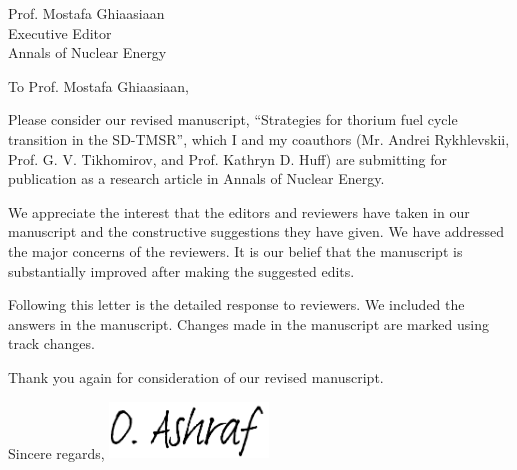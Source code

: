 \documentclass[11pt]{letter} %
\newcommand{\RecipientName}{Prof. Mostafa Ghiaasiaan\xspace}
\newcommand{\RecipientAddress}{Executive Editor\\Annals of Nuclear Energy}
\begin{document}
	\begin{letter}{\RecipientName\\
			\RecipientAddress\xspace}
		
		\address{O. Ashraf\\
			oabdelaziz@mephi.ru\\
			osama.ashraf@edu.asu.edu.eg\\
			Institute of Nuc. Physics and Eng.\\
			National Research Nuclear University\\
			Moscow, Russia, 115409}
		
		
		\opening{To \RecipientName,}
		
		Please consider our revised manuscript, ``Strategies for thorium fuel cycle transition in the SD-TMSR'', which I and my coauthors (Mr. Andrei Rykhlevskii, Prof. G. V. Tikhomirov, 
		and Prof. Kathryn D. Huff) are submitting for publication as a research article 
		in Annals of Nuclear Energy.
		 
		We appreciate the interest that the editors and reviewers have taken in our manuscript and the constructive suggestions they have given. We have addressed the major concerns of the reviewers. It is our belief that the manuscript is substantially improved after making the suggested edits.
		
		
		Following this letter is the detailed response to reviewers. We included the 
	    answers in the manuscript. Changes made in the manuscript are marked using track changes.
		
		
		
		Thank you again for consideration of our revised manuscript.
		
		
		\closing{Sincere regards,
			\includegraphics[height=1.5cm]{signature.png}\\
		}
		
		
	\end{letter}
	
\end{document}
